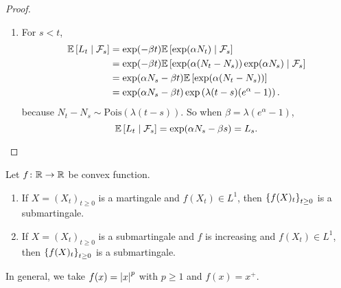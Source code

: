 \begin{exam}
\begin{proof}
\begin{enumerate}[label=(\arabic{*})]
            \item For $s < t$,
            \begin{align*}
                \mathbb{E}\left[L_t \mid \mathcal{F}_s\right] &= \exp (- \beta t)\mathbb{E}\left[\exp (\alpha N_t) \mid \mathcal{F}_s\right] \\
                &= \exp (- \beta t)\mathbb{E}\left[\exp (\alpha (N_t-N_s))\exp(\alpha N_s) \mid \mathcal{F}_s\right] \\
                &= \exp (\alpha N_s - \beta t) \mathbb{E}\left[\exp (\alpha (N_t-N_s))\right] \\
                &= \exp (\alpha N_s - \beta t) \exp \left(\lambda(t-s)(e^\alpha - 1)\right).
            \end{align*}
            because $N_t - N_s \sim \text{Pois}(\lambda(t-s))$. So when $\beta = \lambda(e^\alpha - 1)$,
            \begin{equation*}
                \mathbb{E}\left[L_t \mid \mathcal{F}_s\right] = \exp (\alpha N_s - \beta s) = L_s. \qedhere
            \end{equation*}
        \end{enumerate}
    \end{proof}
\end{exam}

\begin{prop}
    Let $f \colon \mathbb{R} \rightarrow \mathbb{R}$ be convex function.
    \begin{enumerate}[label=(\arabic{*})]
        \item If $X = (X_t)_{t \geq 0}$ is a martingale and $f(X_t) \in L^1$, then $\left\{f(X)_t\right\}_{t\geq 0}$ is a submartingale.
        \item If $X = (X_t)_{t \geq 0}$ is a submartingale and $f$ is increasing and $f(X_t) \in L^1$, then $\left\{f(X)_t\right\}_{t\geq 0}$ is a submartingale.
    \end{enumerate}
\end{prop}
\begin{rmk}
    In general, we take $f(x) = \left\lvert x\right\lvert^p$ with $p \geq 1$ and $f(x) = x^+$.
\end{rmk}

